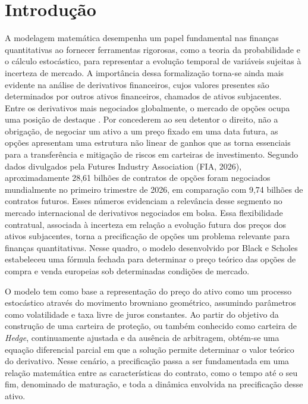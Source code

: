 \section{Introdução}
A modelagem matemática desempenha um papel fundamental nas finanças quantitativas ao fornecer ferramentas rigorosas, como a teoria da probabilidade e o cálculo estocástico, para representar a evolução temporal de variáveis sujeitas à incerteza de mercado. A importância dessa formalização torna-se ainda mais evidente na análise de  derivativos financeiros, cujos valores presentes são determinados por outros ativos financeiros, chamados de ativos subjacentes.
Entre os derivativos mais negociados globalmente, o mercado de opções ocupa uma posição de destaque \cite{fia2026options}. Por concederem ao seu detentor o direito, não a obrigação, de negociar um ativo a um preço fixado em uma data futura, as opções apresentam uma estrutura não linear de ganhos que as torna essenciais para a transferência e mitigação de riscos em carteiras de investimento. Segundo dados divulgados pela Futures Industry Association (FIA, 2026), aproximadamente 28,61 bilhões de contratos de opções foram negociados mundialmente no primeiro trimestre de 2026, em comparação com 9,74 bilhões de contratos futuros. Esses números evidenciam a relevância desse segmento no mercado internacional de derivativos negociados em bolsa. Essa flexibilidade contratual, associada à incerteza em relação a evolução futura dos preços dos ativos subjacentes, torna a precificação de opções um problema relevante para finanças quantitativas. Nesse quadro, o modelo desenvolvido por Black e Scholes \cite{blackscholes1973} estabeleceu uma fórmula fechada para determinar o preço teórico das opções de compra e venda europeias sob determinadas condições de mercado.

O modelo tem como base a representação do preço do ativo como um processo estocástico através do movimento browniano geométrico, assumindo parâmetros como volatilidade e taxa livre de juros constantes. Ao partir do objetivo da construção de uma carteira de proteção, ou também conhecido como carteira de \textit{Hedge}, continuamente ajustada e da ausência de arbitragem, obtém-se uma equação diferencial parcial em que a solução permite determinar o valor teórico do derivativo. Nesse cenário, a precificação passa a ser fundamentada em uma relação matemática entre as características do contrato, como o tempo até o seu fim, denominado de maturação, e toda a dinâmica envolvida na precificação desse ativo.

